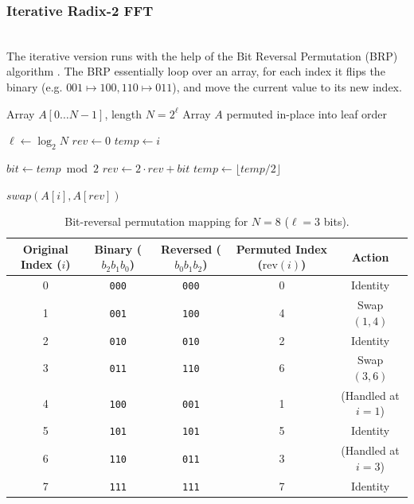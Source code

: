 \documentclass{article}
\begin{document}
\subsubsection{Iterative Radix-2 FFT}~{}\\
The iterative version runs with the help of the Bit Reversal Permutation (BRP) algorithm \cite{thomas2009introduction}. The BRP essentially loop over an array, for each index it flips the binary (e.g. $001 \mapsto 100, 110 \mapsto 011$), and move the current value to its new index. 
\begin{algorithm}[H]
\caption{Bit-Reversal Permutation}
\label{alg:bit_reversal_arithmetic}
\begin{algorithmic}[1]
\Require Array $A[0 \dots N-1]$, length $N = 2^\ell$
\Ensure Array $A$ permuted in-place into leaf order

\State $\ell \gets \log_2N$
        \State $rev \gets 0$
        \State $temp \gets i$
        
            \State $bit \gets temp \bmod 2$ 
            \State $rev \gets 2 \cdot rev + bit$ 
            \State $temp \gets \lfloor temp / 2 \rfloor$ 
        \EndFor
        
            \State $swap(A[i], A[rev])$
        \EndIf
    \EndFor
\EndProcedure
\end{algorithmic}
\end{algorithm}
\begin{table}[H]
\centering
\caption{Bit-reversal permutation mapping for $N = 8$ ($\ell = 3$ bits).}
\label{tab:bit_reversal}
\begin{tabular}{ccccc}
\toprule
Original Index ($i$) & Binary ($b_2 b_1 b_0$) & Reversed ($b_0 b_1 b_2$) & Permuted Index ($\text{rev}(i)$) & Action \\
\midrule
0 & \texttt{000} & \texttt{000} & 0 & Identity \\
1 & \texttt{001} & \texttt{100} & 4 & Swap $(1, 4)$ \\
2 & \texttt{010} & \texttt{010} & 2 & Identity \\
3 & \texttt{011} & \texttt{110} & 6 & Swap $(3, 6)$ \\
4 & \texttt{100} & \texttt{001} & 1 & (Handled at $i=1$) \\
5 & \texttt{101} & \texttt{101} & 5 & Identity \\
6 & \texttt{110} & \texttt{011} & 3 & (Handled at $i=3$) \\
7 & \texttt{111} & \texttt{111} & 7 & Identity \\
\bottomrule
\end{tabular}
\end{table}
\end{document}
